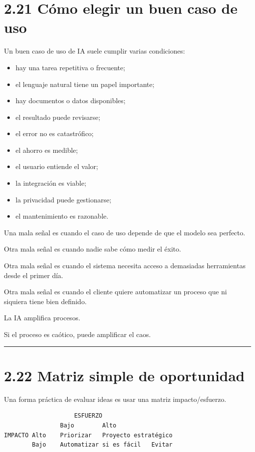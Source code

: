 \section{2.21 Cómo elegir un buen caso de
uso}\label{cuxf3mo-elegir-un-buen-caso-de-uso}

Un buen caso de uso de IA suele cumplir varias condiciones:

\begin{itemize}
\tightlist
\item
  hay una tarea repetitiva o frecuente;
\item
  el lenguaje natural tiene un papel importante;
\item
  hay documentos o datos disponibles;
\item
  el resultado puede revisarse;
\item
  el error no es catastrófico;
\item
  el ahorro es medible;
\item
  el usuario entiende el valor;
\item
  la integración es viable;
\item
  la privacidad puede gestionarse;
\item
  el mantenimiento es razonable.
\end{itemize}

Una mala señal es cuando el caso de uso depende de que el modelo sea
perfecto.

Otra mala señal es cuando nadie sabe cómo medir el éxito.

Otra mala señal es cuando el sistema necesita acceso a demasiadas
herramientas desde el primer día.

Otra mala señal es cuando el cliente quiere automatizar un proceso que
ni siquiera tiene bien definido.

La IA amplifica procesos.

Si el proceso es caótico, puede amplificar el caos.

\begin{center}\rule{0.5\linewidth}{0.5pt}\end{center}

\section{2.22 Matriz simple de
oportunidad}\label{matriz-simple-de-oportunidad}

Una forma práctica de evaluar ideas es usar una matriz impacto/esfuerzo.

\begin{lstlisting}
                    ESFUERZO
                Bajo        Alto
IMPACTO Alto    Priorizar   Proyecto estratégico
        Bajo    Automatizar si es fácil   Evitar
\end{lstlisting}

